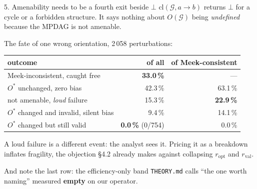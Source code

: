 \documentclass[10pt,aspectratio=169]{beamer}
\newcommand{\no}[1]{\textcolor{bad}{#1}}
\newcommand{\wn}[1]{\textcolor{warn}{#1}}
\begin{document}
\begin{frame}[shrink=12]{5. Amenability needs to be a fourth exit beside $\bot$}
$\mathrm{cl}(\mathcal{G}, a \to b)$ returns $\bot$ for a cycle or a forbidden structure. It says
nothing about $O(\mathcal{G})$ being \emph{undefined} because the MPDAG is not amenable.

\medskip
The fate of one wrong orientation, 2\,058 perturbations:

\begin{center}
\begin{tabular}{lrr}
\toprule
outcome & of all & of Meek-consistent \\
\midrule
Meek-inconsistent, caught free & \textbf{33.0\,\%} & --- \\
$O^\ast$ unchanged, zero bias & 42.3\,\% & 63.1\,\% \\
\wn{not amenable, \emph{loud} failure} & \wn{15.3\,\%} & \wn{\textbf{22.9\,\%}} \\
$O^\ast$ changed and invalid, \no{silent bias} & 9.4\,\% & \no{14.1\,\%} \\
$O^\ast$ changed but still valid & \textbf{0.0\,\%} \small(0/754) & 0.0\,\% \\
\bottomrule
\end{tabular}
\end{center}

\smallskip
A loud failure is a different event: the analyst sees it. Pricing it as a breakdown inflates
fragility, the objection \S4.2 already makes against collapsing $r_{\mathrm{opt}}$ and
$r_{\mathrm{val}}$.

\smallskip
\wn{And note the last row: the efficiency-only band \texttt{THEORY.md} calls ``the one worth
naming'' measured \textbf{empty} on our operator.}
\end{frame}
\end{document}
